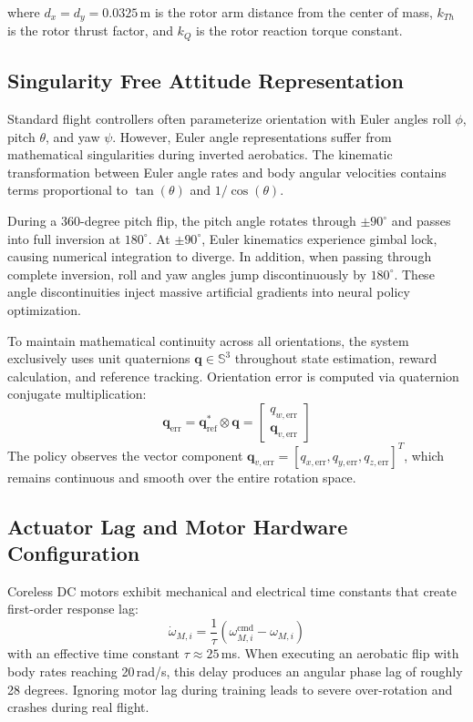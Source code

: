 \documentclass[11pt,a4paper]{article}
\begin{document}
where $d_x = d_y = 0.0325$\,m is the rotor arm distance from the center of mass, $k_{Th}$ is the rotor thrust factor, and $k_Q$ is the rotor reaction torque constant.

\subsection{Singularity Free Attitude Representation}
Standard flight controllers often parameterize orientation with Euler angles roll $\phi$, pitch $\theta$, and yaw $\psi$. However, Euler angle representations suffer from mathematical singularities during inverted aerobatics. The kinematic transformation between Euler angle rates and body angular velocities contains terms proportional to $\tan(\theta)$ and $1/\cos(\theta)$.

During a 360-degree pitch flip, the pitch angle rotates through $\pm 90^\circ$ and passes into full inversion at $180^\circ$. At $\pm 90^\circ$, Euler kinematics experience gimbal lock, causing numerical integration to diverge. In addition, when passing through complete inversion, roll and yaw angles jump discontinuously by $180^\circ$. These angle discontinuities inject massive artificial gradients into neural policy optimization.

To maintain mathematical continuity across all orientations, the system exclusively uses unit quaternions $\mathbf{q} \in \mathbb{S}^3$ throughout state estimation, reward calculation, and reference tracking. Orientation error is computed via quaternion conjugate multiplication:
\begin{equation}
  \mathbf{q}_{\text{err}} = \mathbf{q}_{\text{ref}}^* \otimes \mathbf{q} = \begin{bmatrix} q_{w,\text{err}} \\ \mathbf{q}_{v,\text{err}} \end{bmatrix}
\end{equation}
The policy observes the vector component $\mathbf{q}_{v,\text{err}} = [q_{x,\text{err}}, q_{y,\text{err}}, q_{z,\text{err}}]^T$, which remains continuous and smooth over the entire rotation space.

\subsection{Actuator Lag and Motor Hardware Configuration}
Coreless DC motors exhibit mechanical and electrical time constants that create first-order response lag:
\begin{equation}
  \dot{\omega}_{M,i} = \frac{1}{\tau} \left(\omega_{M,i}^{\text{cmd}} - \omega_{M,i}\right)
\end{equation}
with an effective time constant $\tau \approx 25$\,ms. When executing an aerobatic flip with body rates reaching 20\,rad/s, this delay produces an angular phase lag of roughly 28 degrees. Ignoring motor lag during training leads to severe over-rotation and crashes during real flight.
\end{document}
